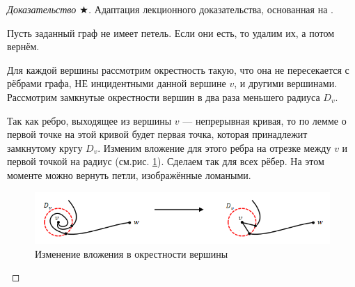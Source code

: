 \begin{proof}[Доказательство $\bigstar$]
    Адаптация лекционного доказательства, основанная на \cite{oshemkov}.
    
    




    Пусть заданный граф не имеет петель. Если они есть, то удалим их, а потом вернём.

    Для каждой вершины рассмотрим окрестность такую, что она не пересекается с рёбрами графа, НЕ инцидентными данной вершине $v$, и другими вершинами. Рассмотрим замкнутые окрестности вершин в два раза меньшего радиуса $D_v$.

    Так как ребро, выходящее из вершины $v$ — непрерывная кривая, то по лемме о первой точке на этой кривой будет первая точка, которая принадлежит замкнутому кругу $D_v$. Изменим вложение для этого ребра на отрезке между $v$ и первой точкой на радиус (см.рис. \ref{fig:c3.6}). Сделаем так для всех рёбер. На этом моменте можно вернуть петли, изображённые ломаными.

    \begin{figure}[h]
        \centering
        \includegraphics[scale=0.7]{images/c3.6.png}
        \caption{Изменение вложения в окрестности вершины}
        \label{fig:c3.6}
    \end{figure}


\end{proof}
